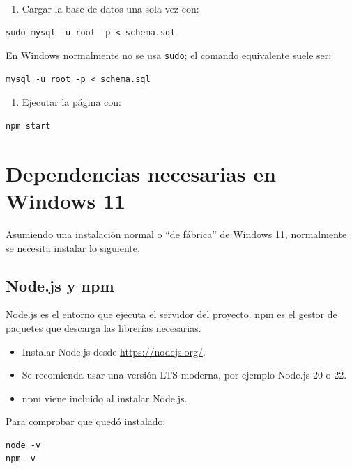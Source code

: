 \documentclass[12pt,letterpaper]{article}
\begin{document}
\begin{enumerate}[resume]
  \item Cargar la base de datos una sola vez con:
\end{enumerate}

\begin{lstlisting}[style=comandos]
sudo mysql -u root -p < schema.sql
\end{lstlisting}

En Windows normalmente no se usa \texttt{sudo}; el comando equivalente suele ser:

\begin{lstlisting}[style=comandos]
mysql -u root -p < schema.sql
\end{lstlisting}

\begin{enumerate}[resume]
  \item Ejecutar la página con:
\end{enumerate}

\begin{lstlisting}[style=comandos]
npm start
\end{lstlisting}

\section{Dependencias necesarias en Windows 11}

Asumiendo una instalación normal o ``de fábrica'' de Windows 11, normalmente se necesita instalar lo siguiente.

\subsection{Node.js y npm}

Node.js es el entorno que ejecuta el servidor del proyecto. npm es el gestor de paquetes que descarga las librerías necesarias.

\begin{itemize}
  \item Instalar Node.js desde \url{https://nodejs.org/}.
  \item Se recomienda usar una versión LTS moderna, por ejemplo Node.js 20 o 22.
  \item npm viene incluido al instalar Node.js.
\end{itemize}

Para comprobar que quedó instalado:

\begin{lstlisting}[style=comandos]
node -v
npm -v
\end{lstlisting}
\end{document}
